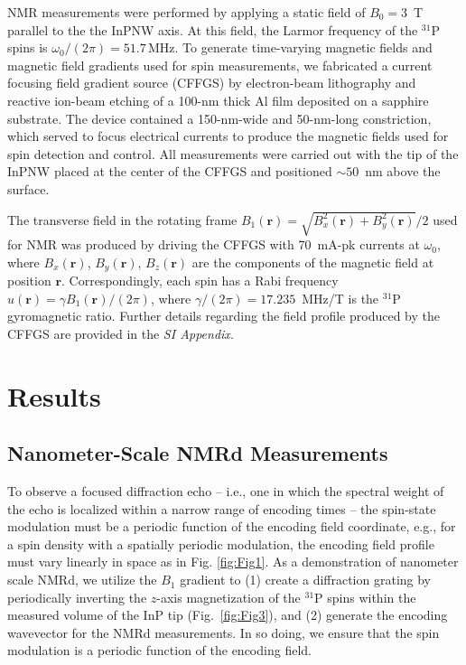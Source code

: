\documentclass[9pt,twocolumn,twoside,lineno]{pnas-new}
\begin{document}
NMR measurements were performed by applying a static field of $B_0=3$~T parallel to the the InPNW axis. At this field, the Larmor frequency of the $^{31}$P spins is $\omega_0/(2\pi)=51.7\,\text{MHz}$. To generate time-varying magnetic fields and magnetic field gradients used for spin measurements, we fabricated a current focusing field gradient source (CFFGS) by electron-beam lithography and reactive ion-beam etching of a 100-nm thick Al film deposited on a sapphire substrate. The device contained a 150-nm-wide and 50-nm-long constriction, which served to focus electrical currents to produce the magnetic fields used for spin detection and control. All measurements were carried out with the tip of the InPNW placed at the center of the CFFGS and positioned $\sim50$~nm above the surface.

The transverse field in the rotating frame $B_1(\mathbf{r})=\sqrt{B_x^2(\mathbf{r})+B_y^2(\mathbf{r})}/2$ used for NMR was produced by driving the CFFGS with 70~mA-pk currents at $\omega_0$, where $B_x(\mathbf{r})$, $B_y(\mathbf{r})$, $B_z(\mathbf{r})$ are the components of the magnetic field at position $\mathbf{r}$.
Correspondingly, each spin has a Rabi frequency $u(\mathbf{r}) = \gamma B_1(\mathbf{r})/(2\pi)$, where $\gamma/(2\pi) = 17.235$~MHz/T is the $^{31}$P gyromagnetic ratio.
Further details regarding the field profile produced by the CFFGS are provided in the \textit{SI Appendix}.



\section*{Results}

\subsection*{Nanometer-Scale NMR\MakeLowercase{d} Measurements}

To observe a focused diffraction echo -- i.e., one in which the spectral weight of the echo is localized within a narrow range of encoding times -- the spin-state modulation must be a periodic function of the encoding field coordinate, e.g., for a spin density with a spatially periodic modulation, the encoding field profile must vary linearly in space as in Fig. \ref{fig:Fig1}.
As a demonstration of nanometer scale NMRd, we utilize the $B_1$ gradient to (1) create a diffraction grating by periodically inverting the $z$-axis magnetization of the $^{31}$P spins within the measured volume of the InP tip (Fig.~\ref{fig:Fig3}), and (2) generate the encoding wavevector for the NMRd measurements. In so doing, we ensure that the spin modulation is a periodic function of the encoding field.
\end{document}
